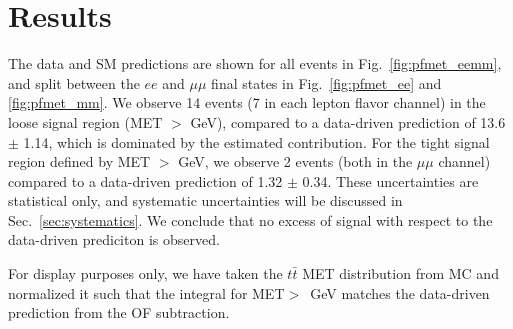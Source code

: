 
\section{Results}
\label{sec:results}

The data and SM predictions are shown for all events in 
Fig.~\ref{fig:pfmet_eemm}, 
and split between the $ee$
and $\mu\mu$ final states in 
Fig.~\ref{fig:pfmet_ee} and \ref{fig:pfmet_mm}. 
We observe 14 events (7 in each lepton flavor channel) 
in the loose signal region (MET $>$ \signalmetl GeV), 
compared to a data-driven prediction of 
13.6 $\pm$ 1.14,
which is dominated by the estimated \ttbar contribution. 
For the tight signal region defined by MET $>$ \signalmett GeV, 
we observe 2 events (both in the $\mu\mu$ channel) compared to a 
data-driven prediction of 
1.32 $\pm$ 0.34.
These uncertainties are statistical only, and systematic uncertainties will be 
discussed in Sec.~\ref{sec:systematics}. We conclude that no excess of signal 
with respect to the data-driven prediciton is observed.

For display purposes only, we have taken the
$t\bar{t}$ MET distribution from MC and normalized it such that the integral for 
MET$>$\signalmetl~GeV matches the data-driven prediction
from the OF subtraction. 



\newcommand{\resultcaption}[1]{
      The observed MET distribution for data in the #1 channels (black points),
      predicted $t\bar{t}$ MET distribution (red line), the sum of predicted 
	  $t\bar{t}$ MET distribution and
      Z  MET  distribution  predicted  from photon  MET  templates
      (solid blue line),  and MC stacked for dominant backgrounds. 
	  Below the  plot is  tabulated the  integral  of the
      predicted  MET distribution  using the  MET templates  method (Z
      pred),  the  predicted ttbar  yield  using  the opposite  flavor
      subtraction  technique (OFOS), the  sum of  these two
      contributions (Z pred + OFOS), and the observed MET distribution
      (data), for MET $>$ 30~GeV and $>$ 60~GeV (which are shown as cross
	  checks), and for the signal regions of MET $>$ 100~GeV and $>$ 200~GeV. 
}

